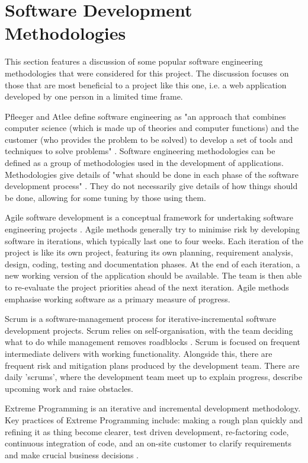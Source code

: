 \documentclass[authoryearcitations]{UoYCSproject}
\begin{document}
\section{Software Development Methodologies}

This section features a discussion of some popular software engineering methodologies that were considered for this project. The discussion focuses on those that are most beneficial to a project like this one, i.e. a web application developed by one person in a limited time frame. 

Pfleeger and Atlee define software engineering as "an approach that combines computer science (which is made up of theories and computer functions) and the customer (who provides the problem to be solved) to develop a set of tools and techniques to solve problems" \citep{Pfleeger}. Software engineering methodologies can be defined as a group of methodologies used in the development of applications. Methodologies give details of "what should be done in each phase of the software development process" \citep{Mnkandla2009}. They do not necessarily give details of how things should be done, allowing for some tuning by those using them. 

Agile software development is a conceptual framework for undertaking software engineering projects \citep{ITKnowledgePortal}. Agile methods generally try to minimise risk by developing software in iterations, which typically last one to four weeks. Each iteration of the project is like its own project, featuring its own planning, requirement analysis, design, coding, testing and documentation phases. At the end of each iteration, a new working version of the application should be available. The team is then able to re-evaluate the project priorities ahead of the next iteration. Agile methods emphasise working software as a primary measure of progress.

Scrum is a software-management process for iterative-incremental software development projects. Scrum relies on self-organisation, with the team deciding what to do while management removes roadblocks \citep{Faridani2011}. Scrum is focused on frequent intermediate delivers with working functionality. Alongside this, there are frequent risk and mitigation plans produced by the development team. There are daily 'scrums', where the development team meet up to explain progress, describe upcoming work and raise obstacles. 

Extreme Programming is an iterative and incremental development methodology. Key practices of Extreme Programming include: making a rough plan quickly and refining it as thing become clearer, test driven development, re-factoring code, continuous integration of code, and an on-site customer to clarify requirements and make crucial business decisions \citep{Faridani2011}. 
\end{document}
